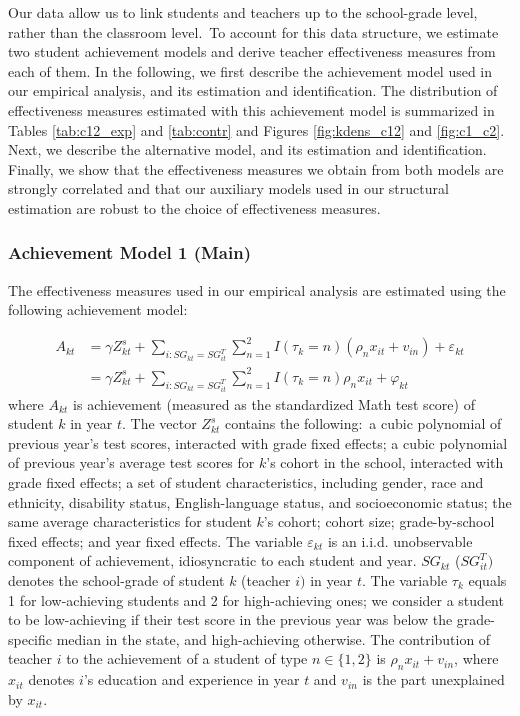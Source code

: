 \documentclass[notitlepage,12pt]{article}%
\begin{document}
Our data allow us to link students and teachers up to the school-grade level,
rather than the classroom level.\ To account for this data structure, we
estimate two student achievement models and derive teacher effectiveness
measures from each of them. In the following, we first describe the
achievement model used in our empirical analysis, and its estimation and
identification. The distribution of effectiveness measures estimated with this
achievement model is summarized in Tables \ref{tab:c12_exp} and
\ref{tab:contr} and Figures \ref{fig:kdens_c12} and \ref{fig:c1_c2}. Next, we
describe the alternative model, and its estimation and identification.
Finally, we show that the effectiveness measures we obtain from both models
are strongly correlated and that our auxiliary models used in our structural
estimation are robust to the choice of effectiveness measures.

\subsubsection{Achievement Model 1 (Main)}

The effectiveness measures used in our empirical analysis are estimated using
the following achievement model:%

\begin{align}
A_{kt}  &  =\gamma Z_{kt}^{s}+\sum_{i:SG_{kt}=SG_{it}^{T}}\sum_{n=1}%
^{2}I\left(  \tau_{k}=n\right)  (\rho_{n}x_{it}+v_{in})+\varepsilon
_{kt}\label{achievement_ols_A}\\
&  =\gamma Z_{kt}^{s}+\sum_{i:SG_{kt}=SG_{it}^{T}}\sum_{n=1}^{2}I\left(
\tau_{k}=n\right)  \rho_{n}x_{it}+\varphi_{kt}%
\end{align}
where $A_{kt}$ is achievement (measured as the standardized Math test score)
of student $k$ in year $t$. The vector $Z_{kt}^{s}$ contains the following:\ a
cubic polynomial of previous year's test scores, interacted with grade fixed
effects; a cubic polynomial of previous year's average test scores for $k$'s
cohort in the school, interacted with grade fixed effects; a set of student
characteristics, including gender, race and ethnicity, disability status,
English-language status, and socioeconomic status; the same average
characteristics for student $k$'s cohort; cohort size; grade-by-school fixed
effects; and year fixed effects. The variable $\varepsilon_{kt}$ is an i.i.d.
unobservable component of achievement, idiosyncratic to each student and year.
$SG_{kt}$ ($SG_{it}^{T})$ denotes the school-grade of student $k$ (teacher
$i)$ in year $t$. The variable $\tau_{k}$ equals 1 for low-achieving students
and 2 for high-achieving ones; we consider a student to be low-achieving if
their test score in the previous year was below the grade-specific median in
the state, and high-achieving otherwise. The contribution of teacher $i$ to
the achievement of a student of type $n\in\{1,2\}$ is $\rho_{n}x_{it}+v_{in}$,
where $x_{it}$ denotes $i$'s education and experience in year $t$ and $v_{in}$
is the part unexplained by $x_{it}$.
\end{document}

